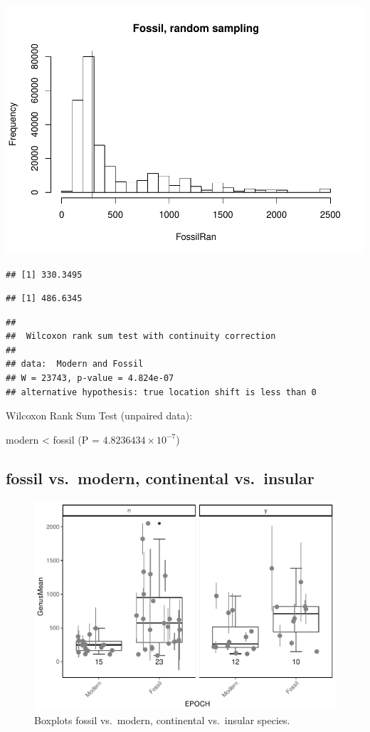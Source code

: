 \documentclass[]{article}
\begin{document}
\includegraphics{MA_JJ_files/figure-latex/RSFM-1.pdf}

\begin{verbatim}
## [1] 330.3495
\end{verbatim}

\begin{verbatim}
## [1] 486.6345
\end{verbatim}

\begin{verbatim}
## 
##  Wilcoxon rank sum test with continuity correction
## 
## data:  Modern and Fossil
## W = 23743, p-value = 4.824e-07
## alternative hypothesis: true location shift is less than 0
\end{verbatim}

Wilcoxon Rank Sum Test (unpaired data):

modern \textless{} fossil (P = \(4.8236434\times 10^{-7}\))

\newpage

\subsection{fossil vs.~modern, continental
vs.~insular}\label{fossil-vs.modern-continental-vs.insular}

\begin{figure}[htbp]
\centering
\includegraphics{MA_JJ_files/figure-latex/BPFMCI-1.pdf}
\caption{Boxplots fossil vs.~modern, continental vs.~insular species.}
\end{figure}
\end{document}
